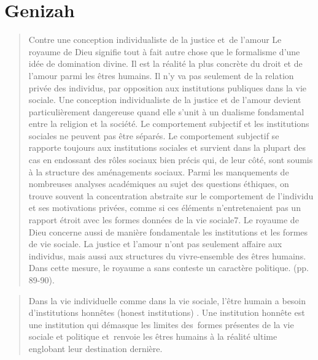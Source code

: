 \section{Genizah}    
 \begin{quote}
     Contre une conception individualiste de la justice et de l’amour Le royaume de Dieu signifie tout à fait autre chose que le formalisme d’une idée de domination divine. Il est la réalité la plus concrète du droit et de l’amour parmi les êtres humains. Il n’y va pas seulement de la relation privée des individus, par opposition aux institutions publiques dans la vie sociale. Une conception individualiste de la justice et de l’amour devient particulièrement dangereuse quand elle s’unit à un dualisme fondamental entre la religion et la société. Le comportement subjectif et les institutions sociales ne peuvent pas être séparés. Le comportement subjectif se rapporte toujours aux institutions sociales et survient dans la plupart des cas en endossant des rôles sociaux bien précis qui, de leur côté, sont soumis à la structure des aménagements sociaux. Parmi les manquements de nombreuses analyses académiques au sujet des questions éthiques, on trouve souvent la concentration abstraite sur le comportement de l’individu et ses motivations privées, comme si ces éléments n’entretenaient pas un rapport étroit avec les formes données de la vie sociale7. Le royaume de Dieu concerne aussi de manière fondamentale les institutions et les formes de vie sociale. La justice et l’amour n’ont pas seulement affaire aux individus, mais aussi aux structures du vivre-ensemble des êtres humains. Dans cette mesure, le royaume a sans conteste un caractère politique. (pp. 89-90). 
 \end{quote}
 
 \begin{quote}
     Dans la vie individuelle comme dans la vie sociale, l’être humain a besoin d’institutions honnêtes (honest institutions) . Une institution honnête est une institution qui démasque les limites des formes présentes de la vie sociale et politique et renvoie les êtres humains à la réalité ultime englobant leur destination dernière.\cite[pp. 98]{Pannenberg:RoyaumeDieu} 
 \end{quote}
 
